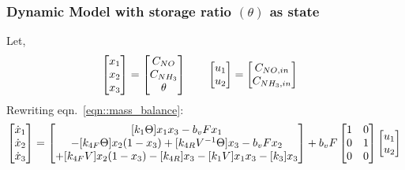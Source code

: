 \subsubsection{Dynamic Model with storage ratio $(\theta)$ as state}
Let,
\begin{align*}
    \begin{bmatrix} x_1 \\ x_2 \\ x_3 \end{bmatrix} = \begin{bmatrix} C_{NO} \\ C_{NH_3} \\ \theta \end{bmatrix} \qquad &
    \begin{bmatrix} u_1 \\ u_2  \end{bmatrix} = \begin{bmatrix} C_{NO, in} \\ C_{NH_3, in} \end{bmatrix}
\end{align*}
Rewriting eqn.~\ref{eqn::mass_balance}:
\begin{equation}\label{eqn::3_state_theta}
    \begin{bmatrix} \dot x_1 \\ \dot x_2 \\ \dot x_3 \end{bmatrix} =
    \begin{bmatrix} [k_1 \Theta] x_1 x_3 - b_v F x_1 \\
        -[k_{4F} \Theta] x_2 (1-x_3) + [k_{4R} V^{-1} \Theta] x_3 - b_v F x_2 \\
        +[k_{4F}V] x_2 (1-x_3) - [k_{4R}] x_3 - [k_1 V] x_1 x_3 - [k_3 ] x_3 \end{bmatrix} +
    b_v F \begin{bmatrix} 1 & 0 \\ 0 & 1 \\ 0 & 0 \end{bmatrix} \begin{bmatrix} u_1 \\ u_2 \end{bmatrix}\\
\end{equation}

